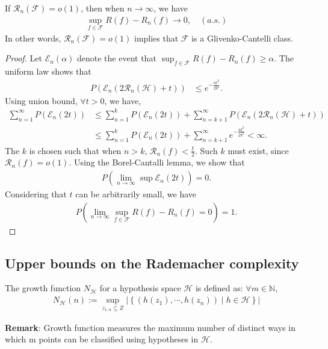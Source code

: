 \begin{theorem} If $\mathcal{R}_n(\mathcal{F}) = o(1)$, then when $n \rightarrow \infty$, we have
\begin{align*}
    \sup_{f\in \mathcal{F}} R(f) - R_n(f) \longrightarrow 0, \quad (a.s.)
\end{align*}
In other words, $\mathcal{R}_n(\mathcal{F}) = o(1)$ implies that $\mathcal{F}$ is a Glivenko-Cantelli class.
\end{theorem}
\begin{proof}
Let $\mathcal{E}_n(\alpha)$ denote the event that $\sup_{f\in \mathcal{F}} R(f) - R_n(f) \geq \alpha$. The uniform law shows that
\begin{align*}
    P\left(\mathcal{E}_n( 2\mathcal{R}_n(\mathcal{H}) + t )\right) & \leq  e^{-\frac{nt^2}{2b^2}}.
\end{align*}
Using union bound,  $\forall t > 0$, we have,
\begin{align*}
   \sum_{n=1}^{\infty} P(\mathcal{E}_n(2t)) & \leq \sum_{n=1}^{k} P\left(\mathcal{E}_n\left(2t\right)\right)  + \sum_{n=k+1}^\infty P\left(\mathcal{E}_n\left(2\mathcal{R}_n(\mathcal{H}) + t \right)\right) \\
    & \leq \sum_{n=1}^{k} P\left(\mathcal{E}_n\left(2t\right)\right) + \sum_{n=k+1}^\infty  e^{-\frac{nt^2}{2b^2}} < \infty.
\end{align*}
The $k$ is chosen such that when $n > k$, $\mathcal{R}_n(f) < \frac{t}{2}$. Such $k$ must exist, since $\mathcal{R}_n(f) = o(1)$.
Using the Borel-Cantalli lemma, we show that
\begin{align*}
    P\left(\lim_{n \rightarrow \infty} \sup \mathcal{E}_n(2t) \right) = 0.
\end{align*}
Considering that $t$ can be arbitrarily small, we have
\begin{align*}
    P\left(\lim_{n \rightarrow \infty} \sup_{f\in \mathcal{F}} R(f) - R_n(f) = 0 \right) = 1.
\end{align*}
\end{proof}

\subsection{Upper bounds on the Rademacher complexity}
\begin{definition}
The growth function $N_\mathcal{H}$ for a hypothesis space $\mathcal{H}$ is defined as: $\forall m \in \mathbb{N}$,
\begin{align*}
    N_{\mathcal{H}}(n) := \sup_{z_{1:n} \subseteq Z }\left|\left\{\left(h\left(z_{1}\right), \cdots, h\left(z_{n}\right)\right) \mid h \in \mathcal{H}\right\}\right|
\end{align*}
\end{definition}
\textbf{Remark}: Growth function measures the maximum number of distinct ways in which m points can be classified using hypotheses in $\mathcal{H}$.

